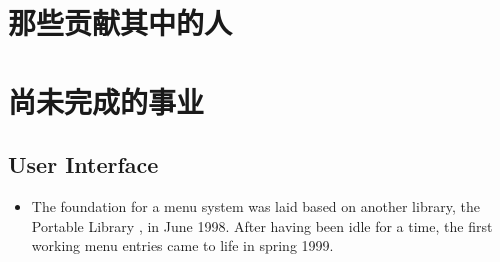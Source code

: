 \section{那些贡献其中的人}

\section{尚未完成的事业}
\fi
\iffalse
\subsection{User Interface}
\begin{itemize}
\item The foundation for a menu system was laid based on another library,
 the Portable Library \PLIB{}, in June 1998. After having been idle for a time, the first working menu entries came to life in spring 1999.


\end{itemize}
